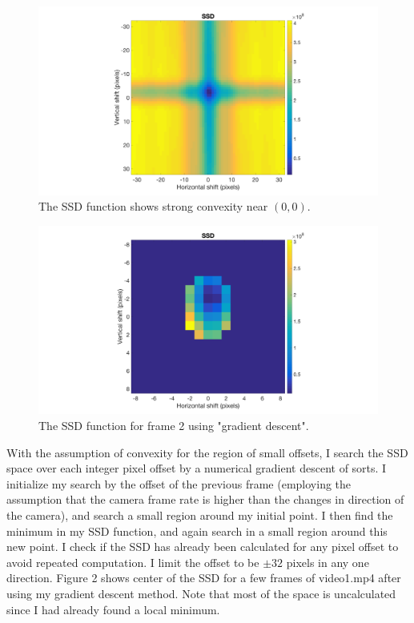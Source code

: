 \documentclass{article}
\begin{document}
\begin{figure}
  \includegraphics[width=\linewidth]{SSD_plot.png}
  \caption{The SSD function shows strong convexity near $(0,0)$.}
  \label{fig:boat1}
\end{figure}
\begin{figure}
  \includegraphics[width=\linewidth]{SSD_GD_plot2.png}
  \caption{The SSD function for frame 2 using "gradient descent".}
  \label{fig:boat1}
\end{figure}

With the assumption of convexity for the region of small offsets, I search the SSD space over each integer pixel offset by a numerical gradient descent of sorts. I initialize my search by the offset of the previous frame (employing the assumption that the camera frame rate is higher than the changes in direction of the camera), and search a small region around my initial point. I then find the minimum in my SSD function, and again search in a small region around this new point. I check if the SSD has already been calculated for any pixel offset to avoid repeated computation. I limit the offset to be $\pm32$ pixels in any one direction. Figure 2 shows center of the SSD for a few frames of video1.mp4 after using my gradient descent method. Note that most of the space is uncalculated since I had already found a local minimum.
\end{document}
